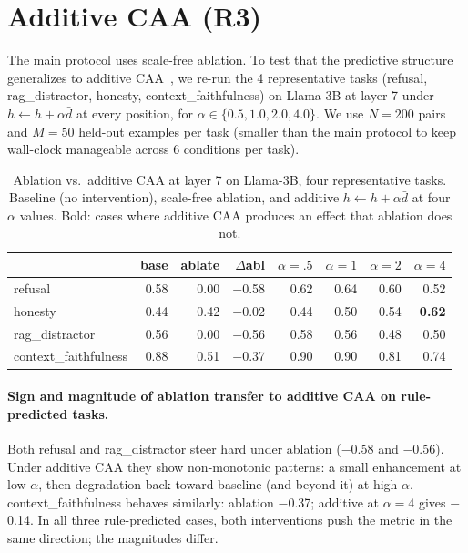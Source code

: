 \documentclass{article}
\begin{document}
\section{Additive CAA (R3)}
\label{app:additive}

The main protocol uses scale-free ablation. To test that the
predictive structure generalizes to additive CAA~\citep{rimsky2023steering},
we re-run the 4 representative tasks (refusal, rag\_distractor,
honesty, context\_faithfulness) on Llama-3B at layer 7 under
$h \leftarrow h + \alpha \bar d$ at every position, for
$\alpha \in \{0.5, 1.0, 2.0, 4.0\}$. We use $N=200$ pairs and
$M=50$ held-out examples per task (smaller than the main protocol
to keep wall-clock manageable across 6 conditions per task).

\begin{table}[h]
\centering\footnotesize
\setlength{\tabcolsep}{3pt}
\begin{tabular}{l r r r r r r r}
\toprule
& base & ablate & $\Delta$abl & $\alpha{=}.5$ & $\alpha{=}1$ & $\alpha{=}2$ & $\alpha{=}4$ \\
\midrule
refusal              & 0.58 & 0.00 & $-$0.58 & 0.62 & 0.64 & 0.60 & 0.52 \\
honesty              & 0.44 & 0.42 & $-$0.02 & 0.44 & 0.50 & 0.54 & \textbf{0.62} \\
rag\_distractor      & 0.56 & 0.00 & $-$0.56 & 0.58 & 0.56 & 0.48 & 0.50 \\
context\_faithfulness & 0.88 & 0.51 & $-$0.37 & 0.90 & 0.90 & 0.81 & 0.74 \\
\bottomrule
\end{tabular}
\caption{Ablation vs.~additive CAA at layer 7 on Llama-3B,
four representative tasks. Baseline (no intervention), scale-free
ablation, and additive $h \leftarrow h + \alpha \bar d$ at four
$\alpha$ values. Bold: cases where additive CAA produces an effect
that ablation does not.}
\label{tab:additive}
\end{table}

\paragraph{Sign and magnitude of ablation transfer to additive CAA
on rule-predicted tasks.}
Both refusal and rag\_distractor steer hard under ablation
($-$0.58 and $-$0.56). Under additive CAA they show non-monotonic
patterns: a small enhancement at low $\alpha$, then degradation back
toward baseline (and beyond it) at high $\alpha$. context\_faithfulness
behaves similarly: ablation $-$0.37; additive at $\alpha=4$
gives $-$0.14. In all three rule-predicted cases, both interventions
push the metric in the same direction; the magnitudes differ.
\end{document}
